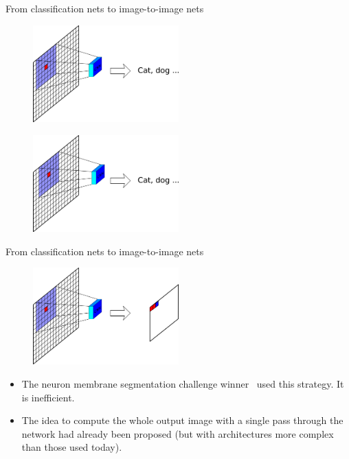 \documentclass[xcolor=pdftex,dvipsnames,table,mathserif]{beamer}
\begin{document}
\begin{frame}{From classification nets to image-to-image nets}

      \begin{figure}
      \includegraphics[width=0.5\textwidth]{image_transf1.png}
      \end{figure}

      \pause

      \begin{figure}
      \includegraphics[width=0.5\textwidth]{image_transf2.png}
      \end{figure}

\end{frame}

\begin{frame}{From classification nets to image-to-image nets}

      \begin{figure}
      \includegraphics[width=0.5\textwidth]{image_transf_fin.png}
      \end{figure}

\pause

      \begin{itemize}
      \item The neuron membrane segmentation challenge winner~\cite{ciresan_deep_2012} used this strategy. It is inefficient.
      \item The idea to compute the whole output image with a single pass through the network had already been proposed \cite{feng_ning_toward_2005, jain_supervised_2007} (but with architectures more complex than those used today).
      \end{itemize}

\end{frame}
\end{document}
